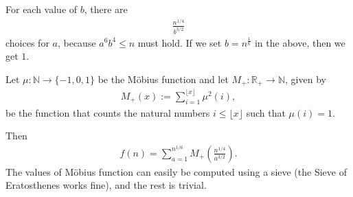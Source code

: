 \documentclass[main.tex]{subfiles}
\begin{document}
For each value of $b$, there are
%
\begin{align}
 \frac{n^{1/4}}{b^{3/2}}
\end{align}
%
choices for $a$, because $a^6 b^4 \leq n$ must hold. If we set $b=n^{\frac{1}{6}}$ in the above, then we get $1$.

Let $\mu: \mathbb N \to \{-1, 0, 1\}$ be the M\"{o}bius function and let $M_+: \mathbb R_+ \to \mathbb N$, given by
%
\begin{align}
 M_+(x) := \sum_{i=1}^{\lfloor x \rfloor} \mu^2(i),
\end{align}
%
be the function that counts the natural numbers $i \leq \lfloor x \rfloor$ such that $\mu(i) = 1$.

Then
%
\begin{align}
 f(n)
 =
 \sum_{a = 1}^{n^{1/6}}
 M_+ \left(
 \frac{n^{1/4}}{a^{3/2}}
 \right).
\end{align}
%
The values of M\"{o}bius function can easily be computed using a sieve (the Sieve of Eratosthenes works fine), and the rest is trivial. 

                
\end{document}

